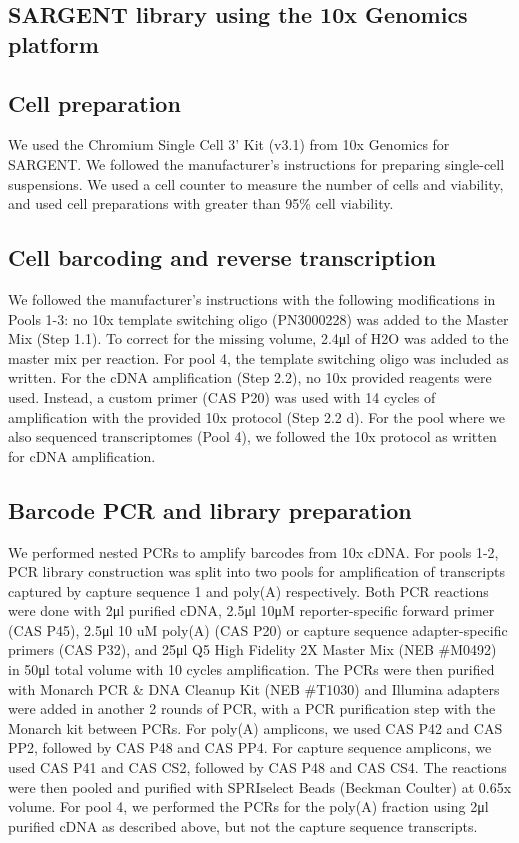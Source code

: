 \subsection*{SARGENT library using the 10x Genomics platform}

\subsection*{Cell preparation}

We used the Chromium Single Cell 3’ Kit (v3.1) from 10x Genomics for SARGENT. We followed the manufacturer’s instructions for preparing single-cell suspensions. We used a cell counter to measure the number of cells and viability, and used cell preparations with greater than 95\% cell viability. 

\subsection*{Cell barcoding and reverse transcription}

We followed the manufacturer’s instructions with the following modifications in Pools 1-3: no 10x template switching oligo (PN3000228) was added to the Master Mix (Step 1.1). To correct for the missing volume, 2.4μl of H2O was added to the master mix per reaction. For pool 4, the template switching oligo was included as written. For the cDNA amplification (Step 2.2), no 10x provided reagents were used. Instead, a custom primer (CAS P20) was used with 14 cycles of amplification with the provided 10x protocol (Step 2.2 d). For the pool where we also sequenced transcriptomes (Pool 4), we followed the 10x protocol as written for cDNA amplification. 

\subsection*{Barcode PCR and library preparation}

We performed nested PCRs to amplify barcodes from 10x cDNA. For pools 1-2, PCR library construction was split into two pools for amplification of transcripts captured by capture sequence 1 and poly(A) respectively. Both PCR reactions were done with 2μl purified cDNA, 2.5μl 10μM reporter-specific forward primer (CAS P45), 2.5μl 10 uM poly(A) (CAS P20) or capture sequence adapter-specific primers (CAS P32), and 25μl Q5 High Fidelity 2X Master Mix (NEB \#M0492) in 50μl total volume with 10 cycles amplification. The PCRs were then purified with Monarch PCR \& DNA Cleanup Kit (NEB \#T1030) and Illumina adapters were added in another 2 rounds of PCR, with a PCR purification step with the Monarch kit between PCRs. For poly(A) amplicons, we used CAS P42 and CAS PP2, followed by CAS P48 and CAS PP4. For capture sequence amplicons, we used CAS P41 and CAS CS2, followed by CAS P48 and CAS CS4. The reactions were then pooled and purified with SPRIselect Beads (Beckman Coulter) at 0.65x volume. For pool 4, we performed the PCRs for the poly(A) fraction using 2μl purified cDNA as described above, but not the capture sequence transcripts.

